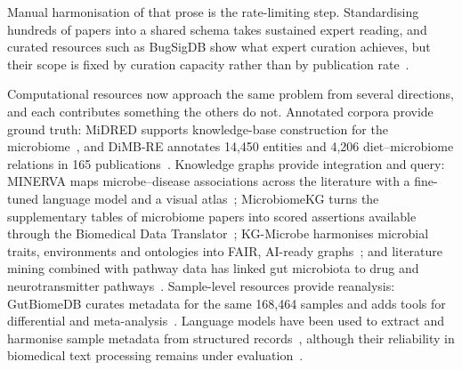 \documentclass[referee,lineno,pdflatex,sn-vancouver-num]{sn-jnl}
\theoremstyle{thmstyleone}%
\theoremstyle{thmstyletwo}%
\theoremstyle{thmstylethree}%
\begin{document}
Manual harmonisation of that prose is the rate-limiting step. Standardising hundreds
of papers into a shared schema takes sustained expert reading, and curated
resources such as BugSigDB show what expert curation achieves, but their scope is
fixed by curation capacity rather than by
publication rate~\cite{geistlinger2023}.

Computational resources now approach the same problem from several
directions, and each contributes something the others do not. Annotated
corpora provide ground truth: MiDRED supports knowledge-base construction for
the microbiome~\cite{hogan2024midred}, and DiMB-RE annotates 14,450 entities
and 4,206 diet--microbiome relations in 165 publications~\cite{hong2025dimbre}.
Knowledge graphs provide integration and query: MINERVA maps microbe--disease
associations across the literature with a fine-tuned language model and a
visual atlas~\cite{langarica2025minerva}; MicrobiomeKG turns the supplementary
tables of microbiome papers into scored assertions available through the
Biomedical Data Translator~\cite{goetz2025microbiomekg}; KG-Microbe harmonises
microbial traits, environments and ontologies into FAIR, AI-ready
graphs~\cite{santangelo2026kgmicrobe}; and literature mining combined with
pathway data has linked gut microbiota to drug and neurotransmitter
pathways~\cite{liu2024mikg}. Sample-level resources provide reanalysis:
GutBiomeDB curates metadata for the same 168,464 samples and adds tools for
differential and meta-analysis~\cite{zhai2026gutbiomedb}. Language models have
been used to extract and harmonise sample metadata from structured
records~\cite{ikeda2025biosample,higashi2024harmonization}, although their
reliability in biomedical text processing remains under
evaluation~\cite{chen2025llmbench}.
\end{document}
